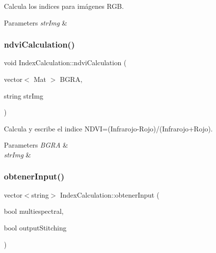 Calcula los indices para imágenes R\+GB. 


\begin{DoxyParams}{Parameters}
{\em str\+Img} & \\
\hline
\end{DoxyParams}
\mbox{\label{classIndexCalculation_a4d727b91eeb0676b3ffcfaf26ec02a32}} 
\subsubsection{\texorpdfstring{ndvi\+Calculation()}{ndviCalculation()}}
{\footnotesize\ttfamily void Index\+Calculation\+::ndvi\+Calculation (\begin{DoxyParamCaption}\item[{vector$<$ Mat $>$}]{B\+G\+RA,  }\item[{string}]{str\+Img }\end{DoxyParamCaption})\hspace{0.3cm}{\ttfamily [inline]}}



Calcula y escribe el indice N\+D\+VI=(Infrarojo-\/\+Rojo)/(Infrarojo+\+Rojo). 


\begin{DoxyParams}{Parameters}
{\em B\+G\+RA} & \\
\hline
{\em str\+Img} & \\
\hline
\end{DoxyParams}
\mbox{\label{classIndexCalculation_a65a88228b2caf575cbbac793a03d1dd6}} 
\subsubsection{\texorpdfstring{obtener\+Input()}{obtenerInput()}}
{\footnotesize\ttfamily vector$<$string$>$ Index\+Calculation\+::obtener\+Input (\begin{DoxyParamCaption}\item[{bool}]{multiespectral,  }\item[{bool}]{output\+Stitching }\end{DoxyParamCaption})\hspace{0.3cm}{\ttfamily [inline]}}



